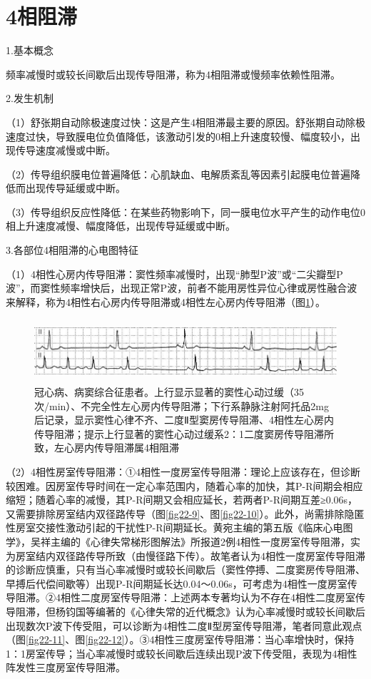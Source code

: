 \protect\hypertarget{text00029.htmlux5cux23subid357}{}{}

\section{4相阻滞}

1.基本概念

频率减慢时或较长间歇后出现传导阻滞，称为4相阻滞或慢频率依赖性阻滞。

2.发生机制

（1）舒张期自动除极速度过快：这是产生4相阻滞最主要的原因。舒张期自动除极速度过快，导致膜电位负值降低，该激动引发的0相上升速度较慢、幅度较小，出现传导速度减慢或中断。

（2）传导组织膜电位普遍降低：心肌缺血、电解质紊乱等因素引起膜电位普遍降低而出现传导延缓或中断。

（3）传导组织反应性降低：在某些药物影响下，同一膜电位水平产生的动作电位0相上升速度减慢、幅度降低，出现传导延缓或中断。

3.各部位4相阻滞的心电图特征

（1）4相性心房内传导阻滞：窦性频率减慢时，出现“肺型P波”或“二尖瓣型P波”，而窦性频率增快后，出现正常P波，前者不能用房性异位心律或房性融合波来解释，称为4相性右心房内传导阻滞或4相性左心房内传导阻滞（图\ref{fig22-8}）。

\begin{figure}[!htbp]
 \centering
 \includegraphics[width=5.80208in,height=0.91667in]{./images/Image00374.jpg}
 \captionsetup{justification=centering}
 \caption{冠心病、病窦综合征患者。上行显示显著的窦性心动过缓（35次/min）、不完全性左心房内传导阻滞；下行系静脉注射阿托品2mg后记录，显示窦性心律不齐、二度Ⅱ型窦房传导阻滞、4相性左心房内传导阻滞；提示上行显著的窦性心动过缓系2：1二度窦房传导阻滞所致，左心房内传导阻滞属4相阻滞}
 \label{fig22-8}
  \end{figure} 

（2）4相性房室传导阻滞：①4相性一度房室传导阻滞：理论上应该存在，但诊断较困难。因房室传导时间在一定心率范围内，随着心率的加快，其P-R间期会相应缩短；随着心率的减慢，其P-R间期又会相应延长，若两者P-R间期互差≥0.06s，又需要排除房室结内双径路传导（图\ref{fig22-9}、图\ref{fig22-10}）。此外，尚需排除隐匿性房室交接性激动引起的干扰性P-R间期延长。黄宛主编的第五版《临床心电图学》，吴祥主编的《心律失常梯形图解法》所报道2例4相性一度房室传导阻滞，实为房室结内双径路传导所致（由慢径路下传）。故笔者认为4相性一度房室传导阻滞的诊断应慎重，只有当心率减慢时或较长间歇后（窦性停搏、二度窦房传导阻滞、早搏后代偿间歇等）出现P-R间期延长达0.04～0.06s，可考虑为4相性一度房室传导阻滞。②4相性二度房室传导阻滞：上述两本专著均认为不存在4相性二度房室传导阻滞，但杨钧国等编著的《心律失常的近代概念》认为心率减慢时或较长间歇后出现数次P波下传受阻，可以诊断为4相性二度Ⅱ型房室传导阻滞，笔者同意此观点（图\ref{fig22-11}、图\ref{fig22-12}）。③4相性三度房室传导阻滞：当心率增快时，保持1：1房室传导；当心率减慢时或较长间歇后连续出现P波下传受阻，表现为4相性阵发性三度房室传导阻滞。

